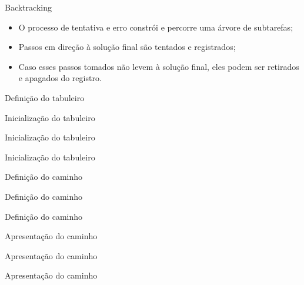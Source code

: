 \documentclass{beamer}
\begin{document}
\begin{frame}{Backtracking}
    \begin{itemize}
        \item O processo de tentativa e erro constrói e percorre uma árvore de subtarefas;
        \item Passos em direção à solução final são tentados e registrados;
        \item Caso esses passos tomados não levem à solução final, eles podem ser retirados e apagados do registro.
    \end{itemize}
\end{frame}


\begin{frame}{Definição do tabuleiro}
\end{frame}

\begin{frame}{Inicialização do tabuleiro}
\end{frame}

\begin{frame}{Inicialização do tabuleiro}
\end{frame}

\begin{frame}{Inicialização do tabuleiro}
\end{frame}

\begin{frame}{Definição do caminho}
\end{frame}

\begin{frame}{Definição do caminho}
\end{frame}

\begin{frame}{Definição do caminho}
\end{frame}

\begin{frame}{Apresentação do caminho}
\end{frame}

\begin{frame}{Apresentação do caminho}
\end{frame}

\begin{frame}{Apresentação do caminho}
\end{frame}


\begin{frame}[t]
    \maketitle
\end{frame}
\end{document}
